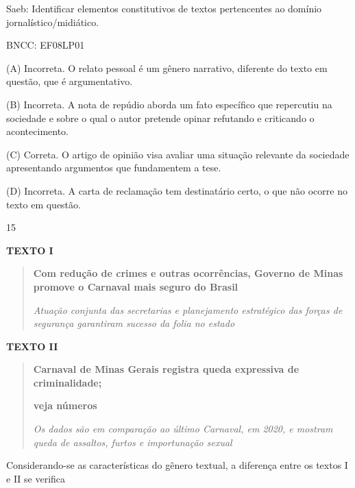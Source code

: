 Saeb: Identificar elementos constitutivos de textos pertencentes ao
domínio jornalístico/midiático.

BNCC: EF08LP01

(A) Incorreta. O relato pessoal é um gênero narrativo, diferente do
texto em questão, que é argumentativo.

(B) Incorreta. A nota de repúdio aborda um fato específico que
repercutiu na sociedade e sobre o qual o autor pretende opinar refutando
e criticando o acontecimento.

(C) Correta. O artigo de opinião visa avaliar uma situação relevante da
sociedade apresentando argumentos que fundamentem a tese.

(D) Incorreta. A carta de reclamação tem destinatário certo, o que não
ocorre no texto em questão.

\num{15}

\textbf{TEXTO I}

\begin{quote}
\textbf{Com redução de crimes e outras ocorrências, Governo de Minas
promove o Carnaval mais seguro do Brasil}

\emph{Atuação conjunta das secretarias e planejamento estratégico das
forças de segurança garantiram sucesso da folia no estado}
\end{quote}


\textbf{TEXTO II}

\begin{quote}
\textbf{Carnaval de Minas Gerais registra queda expressiva de
criminalidade;}

\textbf{veja números}

\emph{Os dados são em comparação ao último Carnaval, em 2020, e mostram
queda de assaltos, furtos e importunação sexual}
\end{quote}


Considerando-se as características do gênero textual, a diferença entre
os textos I e II se verifica

